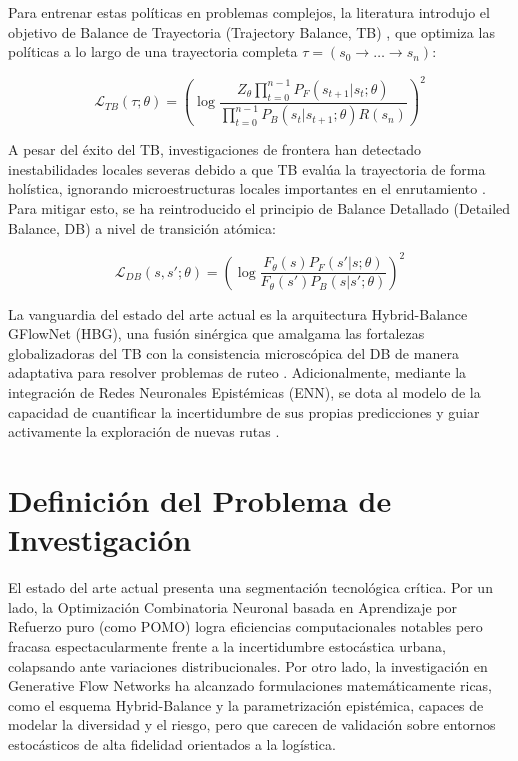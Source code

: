 \documentclass[12pt]{report}
\begin{document}
Para entrenar estas pol\'iticas en problemas complejos, la literatura introdujo el objetivo de Balance de Trayectoria (Trajectory Balance, TB) \cite{Malkin2022Trajectory}, que optimiza las pol\'iticas a lo largo de una trayectoria completa $\tau = (s_0 \to \dots \to s_n)$:

\begin{equation}
\mathcal{L}_{TB}(\tau; \theta) = \left( \log \frac{Z_\theta \prod_{t=0}^{n-1} P_F(s_{t+1}|s_t; \theta)}{\prod_{t=0}^{n-1} P_B(s_t|s_{t+1}; \theta) R(s_n)} \right)^2
\label{eq:tb}
\end{equation}

A pesar del \'exito del TB, investigaciones de frontera han detectado inestabilidades locales severas debido a que TB eval\'ua la trayectoria de forma hol\'istica, ignorando microestructuras locales importantes en el enrutamiento \cite{Zhang2025Hybrid}. Para mitigar esto, se ha reintroducido el principio de Balance Detallado (Detailed Balance, DB) a nivel de transici\'on at\'omica:

\begin{equation}
\mathcal{L}_{DB}(s, s'; \theta) = \left( \log \frac{F_\theta(s) P_F(s'|s; \theta)}{F_\theta(s') P_B(s|s'; \theta)} \right)^2
\label{eq:db}
\end{equation}

La vanguardia del estado del arte actual es la arquitectura Hybrid-Balance GFlowNet (HBG), una fusi\'on sin\'ergica que amalgama las fortalezas globalizadoras del TB con la consistencia microsc\'opica del DB de manera adaptativa para resolver problemas de ruteo \cite{Zhang2025Hybrid}. Adicionalmente, mediante la integraci\'on de Redes Neuronales Epist\'emicas (ENN), se dota al modelo de la capacidad de cuantificar la incertidumbre de sus propias predicciones y guiar activamente la exploraci\'on de nuevas rutas \cite{ENN_GFN_2025}.

\chapter*{Definici\'on del Problema de Investigaci\'on}

El estado del arte actual presenta una segmentaci\'on tecnol\'ogica cr\'itica. Por un lado, la Optimizaci\'on Combinatoria Neuronal basada en Aprendizaje por Refuerzo puro (como POMO) logra eficiencias computacionales notables pero fracasa espectacularmente frente a la incertidumbre estoc\'astica urbana, colapsando ante variaciones distribucionales. Por otro lado, la investigaci\'on en Generative Flow Networks ha alcanzado formulaciones matem\'aticamente ricas, como el esquema Hybrid-Balance y la parametrizaci\'on epist\'emica, capaces de modelar la diversidad y el riesgo, pero que carecen de validaci\'on sobre entornos estoc\'asticos de alta fidelidad orientados a la log\'istica.
\end{document}
